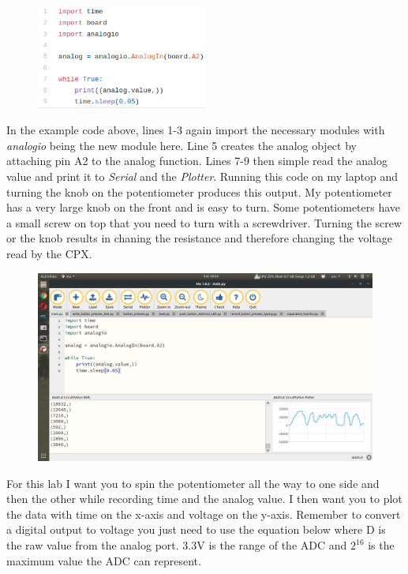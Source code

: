 \begin{figure}[H]
  \begin{center}
    \includegraphics[width=0.5\textwidth]{Figures/analogio.png}
  \end{center}
\end{figure}
In the example code above, lines 1-3 again import the necessary modules with {\it analogio} being the new module here. Line 5 creates the analog object by attaching pin A2 to the analog function. Lines 7-9 then simple read the analog value and print it to {\it Serial} and the {\it Plotter}. Running this code on my laptop and turning the knob on the potentiometer produces this output. My potentiometer has a very large knob on the front and is easy to turn. Some potentiometers have a small screw on top that you need to turn with a screwdriver. Turning the screw or the knob results in chaning the resistance and therefore changing the voltage read by the CPX.
\begin{figure}[H]
  \begin{center}
    \includegraphics[width=\textwidth]{Figures/analogio_mu.png}
  \end{center}
\end{figure}
For this lab I want you to spin the potentiometer all the way to one side and then the other while recording time and the analog value. I then want you to plot the data with time on the x-axis and voltage on the y-axis. Remember to convert a digital output to voltage you just need to use the equation below where D is the raw value from the analog port. 3.3V is the range of the ADC and $2^{16}$ is the maximum value the ADC can represent.
